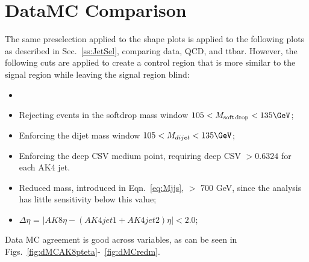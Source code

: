 \section{DataMC Comparison\label{sec:BkgComp}}



The same preselection applied to the shape plots is applied to the following plots as described in Sec.~\ref{ss:JetSel}, comparing data, QCD, and ttbar. However, the following cuts are applied to create a control region that is more similar to the signal region while leaving the signal region blind:
\begin{itemize}
\item 
\item Rejecting events in the softdrop mass window $105 < M_{\rm soft\,drop} < 135 \GeV$;
\item Enforcing the dijet mass window $105 < M_{dijet} < 135 \GeV$;
\item Enforcing the deep CSV medium point, requiring deep CSV $> 0.6324$ for each AK4 jet.
 \item Reduced mass, introduced in Eqn.~\ref{eq:Mjjs}, $>$ 700 GeV, since the analysis has little sensitivity below this value;
 \item $\Delta\eta$ = $|AK8\eta - (AK4jet1 + AK4jet2)\eta| < 2.0$;
\end{itemize} 
Data MC agreement is good across variables, as can be seen in Figs.~\ref{fig:dMCAK8pteta}-~\ref{fig:dMCredm}. 

